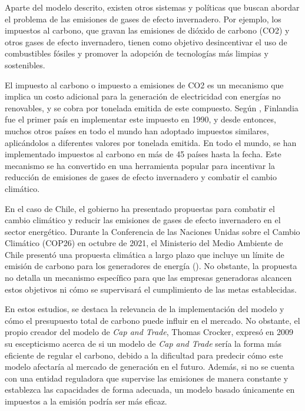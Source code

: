 Aparte del modelo descrito, existen otros sistemas y políticas que buscan abordar el problema de las emisiones de gases de efecto invernadero. Por ejemplo, los impuestos al carbono, que gravan las emisiones de dióxido de carbono (CO2) y otros gases de efecto invernadero, tienen como objetivo desincentivar el uso de combustibles fósiles y promover la adopción de tecnologías más limpias y sostenibles.
\vspace{2.5mm}

El impuesto al carbono o impuesto a emisiones de CO2 es un mecanismo que implica un costo adicional para la generación de electricidad con energías no renovables, y se cobra por tonelada emitida de este compuesto. Según , Finlandia fue el primer país en implementar este impuesto en 1990, y desde entonces, muchos otros países en todo el mundo han adoptado impuestos similares, aplicándolos a diferentes valores por tonelada emitida. En todo el mundo, se han implementado impuestos al carbono en más de 45 países hasta la fecha. Este mecanismo se ha convertido en una herramienta popular para incentivar la reducción de emisiones de gases de efecto invernadero y combatir el cambio climático.
\vspace{2.5mm}

En el caso de Chile, el gobierno ha presentado propuestas para combatir el cambio climático y reducir las emisiones de gases de efecto invernadero en el sector energético. Durante la Conferencia de las Naciones Unidas sobre el Cambio Climático (COP26) en octubre de 2021, el Ministerio del Medio Ambiente de Chile presentó una propuesta climática a largo plazo que incluye un límite de emisión de carbono para los generadores de energía (). No obstante, la propuesta no detalla un mecanismo específico para que las empresas generadoras alcancen estos objetivos ni cómo se supervisará el cumplimiento de las metas establecidas.
\vspace{2.5mm}

En estos estudios, se destaca la relevancia de la implementación del modelo y cómo el presupuesto total de carbono puede influir en el mercado. No obstante, el propio creador del modelo de \textit{Cap and Trade}, Thomas Crocker, expresó en 2009 su escepticismo acerca de si un modelo de \textit{Cap and Trade} sería la forma más eficiente de regular el carbono, debido a la dificultad para predecir cómo este modelo afectaría al mercado de generación en el futuro. Además, si no se cuenta con una entidad reguladora que supervise las emisiones de manera constante y establezca las capacidades de forma adecuada, un modelo basado únicamente en impuestos a la emisión podría ser más eficaz.
\vspace{2.5mm}

